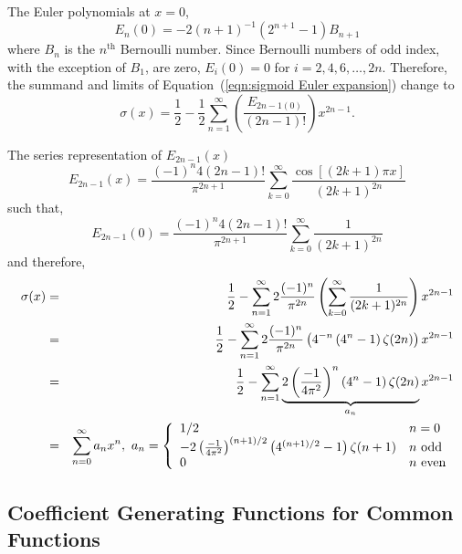 The Euler polynomials at $x=0$,
\begin{equation}
	E_n(0) = -2(n+1)^{-1} \left( 2^{n+1} - 1 \right) B_{n+1}
\end{equation}
where $B_n$ is the $n^\textrm{th}$ Bernoulli number. Since Bernoulli numbers of odd index, with the exception of $B_1$, are zero, $E_i(0) = 0$ for $i = 2, 4, 6, \ldots, 2n$. Therefore, the summand and limits of Equation~(\ref{eqn:sigmoid Euler expansion}) change to
\begin{equation}
	\sigma(x) = \frac{1}{2} - \frac{1}{2} \sum_{n=1}^\infty \left( \frac{E_{2n-1(0)}}{(2n-1)!} \right) x^{2n-1}.
\end{equation}

The series representation of $E_{2n-1}(x)$
\begin{equation}
	E_{2n-1}(x) = \frac{(-1)^n 4 (2n - 1)!}{\pi^{2n+1}} \sum_{k=0}^\infty \frac{\cos [(2k + 1) \pi x]}{(2k + 1)^{2n}}
\end{equation}
such that,
\begin{equation}
	E_{2n-1}(0) = \frac{(-1)^n 4 (2n - 1)!}{\pi^{2n+1}} \sum_{k=0}^\infty \frac{1}{(2k + 1)^{2n}}
\end{equation}
and therefore,
\begin{eqnarray}
	\sigma(x) & = & \frac{1}{2} - \sum_{n=1}^\infty 2 \frac{(-1)^n}{\pi^{2n}} \left( \sum_{k=0}^\infty \frac{1}{(2k+1)^{2n}} \right) x^{2n-1} \\
		& = & \frac{1}{2} - \sum_{n=1}^\infty 2 \frac{(-1)^n}{\pi^{2n}} \left( 4^{-n} \left( 4^n - 1 \right) \zeta(2n) \right) x^{2n-1} \nonumber \\
		& = & \frac{1}{2} - \sum_{n=1}^\infty \underbrace{2 \left( \frac{-1}{4\pi^2} \right)^n \left( 4^n - 1 \right) \zeta(2n)}_{a_n} x^{2n-1} \nonumber \\
		& = & \sum_{n=0}^\infty a_n x^n,\ a_n = \left\{ \begin{array}{l l}
			1/2	& n = 0 \\
			-2 \left( \frac{-1}{4\pi^2} \right)^{(n+1)/2} \left( 4^{(n+1)/2} - 1 \right)\zeta(n+1)	& n\ \text{odd} \\
			0	& n\ \text{even}
		\end{array}\right.
		\label{eqn:sigmoid zeta expansion}
\end{eqnarray}

\subsection{Coefficient Generating Functions for Common Functions}

